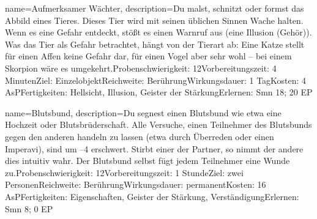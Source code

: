 {
    name={Aufmerksamer Wächter},
    description={Du malst, schnitzt oder formst das Abbild eines Tieres. Dieses Tier wird mit seinen üblichen Sinnen Wache halten. Wenn es eine Gefahr entdeckt, stößt es einen Warnruf aus (eine Illusion (Gehör)). Was das Tier als Gefahr betrachtet, hängt von der Tierart ab: Eine Katze stellt für einen Affen keine Gefahr dar, für einen Vogel aber sehr wohl – bei einem Skorpion wäre es umgekehrt.\newline Probenschwierigkeit: 12\newline Vorbereitungszeit: 4 Minuten\newline Ziel: Einzelobjekt\newline Reichweite: Berührung\newline Wirkungsdauer: 1 Tag\newline Kosten: 4 AsP\newline Fertigkeiten: Hellsicht, Illusion, Geister der Stärkung\newline Erlernen: Smn 18; 20 EP}
}


{
    name={Blutsbund},
    description={Du segnest einen Blutsbund wie etwa eine Hochzeit oder Blutsbrüderschaft. Alle Versuche, einen Teilnehmer des Blutsbunds gegen den anderen handeln zu lassen (etwa durch Überreden oder einen Imperavi), sind um –4 erschwert. Stirbt einer der Partner, so nimmt der andere dies intuitiv wahr. Der Blutsbund selbst fügt jedem Teilnehmer eine Wunde zu.\newline Probenschwierigkeit: 12\newline Vorbereitungszeit: 1 Stunde\newline Ziel: zwei Personen\newline Reichweite: Berührung\newline Wirkungsdauer: permanent\newline Kosten: 16 AsP\newline Fertigkeiten: Eigenschaften, Geister der Stärkung, Verständigung\newline Erlernen: Smn 8; 0 EP}
}


